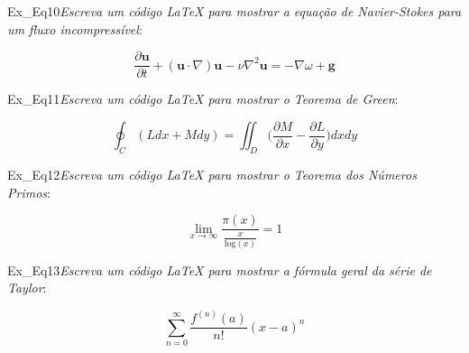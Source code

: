 \begin{texercise}{Ex_Eq10}\textit{Escreva um código LaTeX para mostrar a equação de Navier-Stokes para um fluxo incompressível}:\par\smallskip%
\begin{tcboutputlisting}
    \begin{center}
        \begin{equation*}
            \frac{\partial{\mathbf{u}}}{\partial{t}} + (\mathbf{u} \cdot \nabla)\mathbf{u} - \nu \nabla^2 \mathbf{u} = - \nabla \omega + \mathbf{g}
        \end{equation*}
    \end{center}
\end{tcboutputlisting}
\tcbuselistingtext%
\end{texercise}

\begin{texercise}{Ex_Eq11}\textit{Escreva um código LaTeX para mostrar o Teorema de Green}:\par\smallskip%
\begin{tcboutputlisting}
    \begin{center}
        \begin{equation*}
            \oint_C (Ldx + Mdy) = \iint_D \bigg(\frac{\partial{M}}{\partial{x}} - \frac{\partial{L}}{\partial{y}}\bigg)dxdy
        \end{equation*}
    \end{center}
\end{tcboutputlisting}
\tcbuselistingtext%
\end{texercise}

\begin{texercise}{Ex_Eq12}\textit{Escreva um código LaTeX para mostrar o Teorema dos Números Primos}:\par\smallskip%
\begin{tcboutputlisting}
    \begin{center}
        \begin{equation*}
            \lim_{x \to \infty} \frac{\pi(x)}{\frac{x}{\text{log}(x)}} = 1
        \end{equation*}
    \end{center}
\end{tcboutputlisting}
\tcbuselistingtext%
\end{texercise}

\begin{texercise}{Ex_Eq13}\textit{Escreva um código LaTeX para mostrar a fórmula geral da série de Taylor}:\par\smallskip%
\begin{tcboutputlisting}
    \begin{center}
        \begin{equation*}
            \sum_{n=0}^{\infty} \frac{f^{(n)}(a)}{n!}(x-a)^n
        \end{equation*}
    \end{center}
\end{tcboutputlisting}
\tcbuselistingtext%
\end{texercise}


